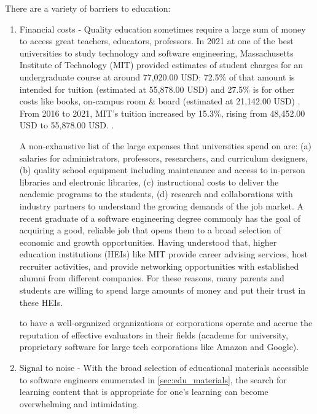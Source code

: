 \documentclass[journal, onecolumn]{IEEEtran}
\begin{document}
There are a variety of barriers to education:

\begin{enumerate}
  \item Financial costs - Quality education sometimes require a large sum of 
  money to access great teachers, educators, professors. In  2021 at one of the best universities to study 
  technology and software engineering, Massachusetts Institute of Technology (MIT) provided estimates of student 
  charges for an undergraduate course at around 77,020.00 USD: 72.5\% of that amount is intended for tuition 
  (estimated at 55,878.00 USD) and 27.5\% is for other costs like books, on-campus room \& board (estimated at 21,142.00 USD) \cite{b8}.
  From 2016 to 2021, MIT's tuition increased by 15.3\%, rising from 48,452.00 USD to 55,878.00 USD. \cite{b8}.
  
  A non-exhaustive list of the large expenses that universities spend on are: (a) salaries for administrators, professors, researchers, 
  and curriculum designers, (b) quality school equipment including maintenance and access to in-person libraries 
  and electronic libraries, (c) instructional costs to deliver the academic programs to the students, (d) 
  research and collaborations with industry partners to understand the growing demands of the job market. 
  A recent graduate of a software engineering degree commonly has the goal of acquiring a good, reliable job that 
  opens them to a broad selection of economic and growth opportunities.
  Having understood that, higher education institutions (HEIs) like MIT provide career advising services, host recruiter activities, and
  provide networking opportunities with established alumni from different companies.  
  For these reasons, many parents and students are willing to spend large amounts of money and 
  put their trust in these HEIs.

  to have a well-organized organizations or corporations operate and accrue the 
  reputation of effective evaluators in their fields (academe for university,
  proprietary software for large tech corporations like Amazon and Google).
  \item Signal to noise - With the broad selection of educational materials 
  accessible to software engineers enumerated in \ref{sec:edu_materials}, 
  the search for learning content that is appropriate for one's learning 
  can become overwhelming and intimidating. 
  

\end{enumerate}
\end{document}
